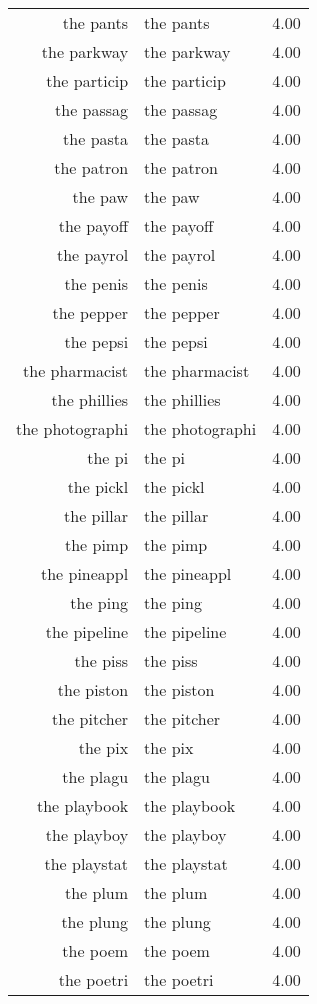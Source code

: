 \begin{table}[ht]
\begin{tabular}{rlr}
  the pants & the pants & 4.00 \\ 
  the parkway & the parkway & 4.00 \\ 
  the particip & the particip & 4.00 \\ 
  the passag & the passag & 4.00 \\ 
  the pasta & the pasta & 4.00 \\ 
  the patron & the patron & 4.00 \\ 
  the paw & the paw & 4.00 \\ 
  the payoff & the payoff & 4.00 \\ 
  the payrol & the payrol & 4.00 \\ 
  the penis & the penis & 4.00 \\ 
  the pepper & the pepper & 4.00 \\ 
  the pepsi & the pepsi & 4.00 \\ 
  the pharmacist & the pharmacist & 4.00 \\ 
  the phillies & the phillies & 4.00 \\ 
  the photographi & the photographi & 4.00 \\ 
  the pi & the pi & 4.00 \\ 
  the pickl & the pickl & 4.00 \\ 
  the pillar & the pillar & 4.00 \\ 
  the pimp & the pimp & 4.00 \\ 
  the pineappl & the pineappl & 4.00 \\ 
  the ping & the ping & 4.00 \\ 
  the pipeline & the pipeline & 4.00 \\ 
  the piss & the piss & 4.00 \\ 
  the piston & the piston & 4.00 \\ 
  the pitcher & the pitcher & 4.00 \\ 
  the pix & the pix & 4.00 \\ 
  the plagu & the plagu & 4.00 \\ 
  the playbook & the playbook & 4.00 \\ 
  the playboy & the playboy & 4.00 \\ 
  the playstat & the playstat & 4.00 \\ 
  the plum & the plum & 4.00 \\ 
  the plung & the plung & 4.00 \\ 
  the poem & the poem & 4.00 \\ 
  the poetri & the poetri & 4.00 \\ 

\end{tabular}
\end{table}
